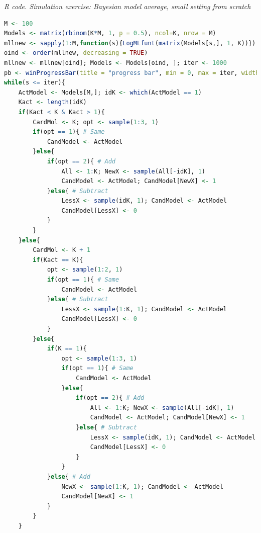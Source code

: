 \begin{tcolorbox}[enhanced,width=4.67in,center upper,
	fontupper=\large\bfseries,drop shadow southwest,sharp corners]
	\textit{R code. Simulation exercise: Bayesian model average, small setting from scratch}
	\begin{VF}
		\begin{lstlisting}[language=R]
M <- 100
Models <- matrix(rbinom(K*M, 1, p = 0.5), ncol=K, nrow = M)
mllnew <- sapply(1:M,function(s){LogMLfunt(matrix(Models[s,], 1, K))})
oind <- order(mllnew, decreasing = TRUE)
mllnew <- mllnew[oind]; Models <- Models[oind, ]; iter <- 1000
pb <- winProgressBar(title = "progress bar", min = 0, max = iter, width = 300); s <- 1
while(s <= iter){
	ActModel <- Models[M,]; idK <- which(ActModel == 1)
	Kact <- length(idK)
	if(Kact < K & Kact > 1){
		CardMol <- K; opt <- sample(1:3, 1)
		if(opt == 1){ # Same
			CandModel <- ActModel
		}else{
			if(opt == 2){ # Add
				All <- 1:K; NewX <- sample(All[-idK], 1)
				CandModel <- ActModel; CandModel[NewX] <- 1
			}else{ # Subtract
				LessX <- sample(idK, 1); CandModel <- ActModel
				CandModel[LessX] <- 0
			}
		}
	}else{
		CardMol <- K + 1
		if(Kact == K){
			opt <- sample(1:2, 1)
			if(opt == 1){ # Same
				CandModel <- ActModel
			}else{ # Subtract
				LessX <- sample(1:K, 1); CandModel <- ActModel
				CandModel[LessX] <- 0
			}
		}else{
			if(K == 1){
				opt <- sample(1:3, 1)
				if(opt == 1){ # Same
					CandModel <- ActModel
				}else{
					if(opt == 2){ # Add
						All <- 1:K; NewX <- sample(All[-idK], 1)
						CandModel <- ActModel; CandModel[NewX] <- 1
					}else{ # Subtract
						LessX <- sample(idK, 1); CandModel <- ActModel
						CandModel[LessX] <- 0
					}
				}
			}else{ # Add
				NewX <- sample(1:K, 1); CandModel <- ActModel
				CandModel[NewX] <- 1
			}
		}
	}
\end{lstlisting}
	\end{VF}
\end{tcolorbox} 

